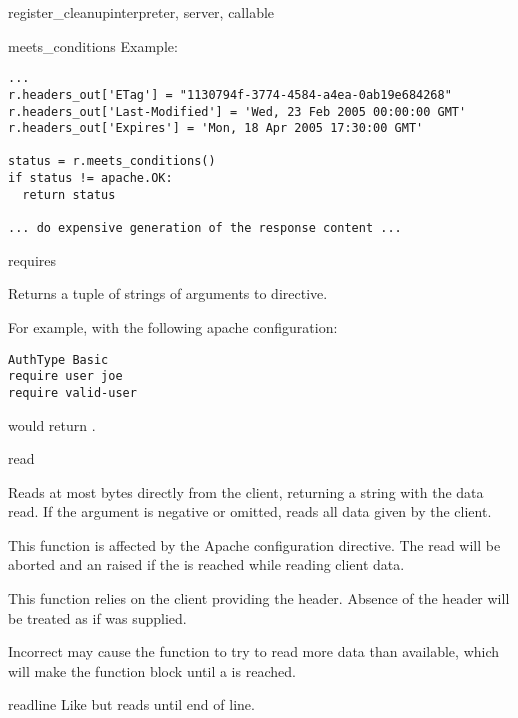 \begin{funcdesc}{register_cleanup}{interpreter, server, callable}
\begin{methoddesc}[request]{meets_conditions}{}
  Example:
  \begin{verbatim}
...
r.headers_out['ETag'] = "1130794f-3774-4584-a4ea-0ab19e684268"
r.headers_out['Last-Modified'] = 'Wed, 23 Feb 2005 00:00:00 GMT'
r.headers_out['Expires'] = 'Mon, 18 Apr 2005 17:30:00 GMT'

status = r.meets_conditions()
if status != apache.OK:
  return status

... do expensive generation of the response content ... 
\end{verbatim}

\end{methoddesc}


\begin{methoddesc}[request]{requires}{}

  Returns a tuple of strings of arguments to  directive.
  
  For example, with the following apache configuration:
  \begin{verbatim}
AuthType Basic
require user joe
require valid-user
  \end{verbatim}
   would return .

\end{methoddesc}

\begin{methoddesc}[request]{read}{}

  Reads at most  bytes directly from the client, returning a
  string with the data read. If the  argument is negative or
  omitted, reads all data given by the client.

  This function is affected by the  Apache configuration
  directive. The read will be aborted and an 
  raised if the  is reached while reading client data.

  This function relies on the client providing the 
  header. Absence of the  header will be treated as
  if  was supplied.

  Incorrect  may cause the function to try to read
  more data than available, which will make the function block until a
   is reached.

\end{methoddesc}

\begin{methoddesc}[request]{readline}{}
  Like  but reads until end of line. 
  

\end{methoddesc}
\end{funcdesc}
